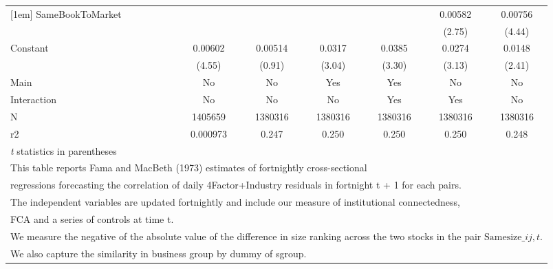 {\begin{tabular}{l*{6}{c}}
[1em]
SameBookToMarket    &                     &                     &                     &                     &     0.00582\sym{**} &     0.00756\sym{***}\\
                    &                     &                     &                     &                     &      (2.75)         &      (4.44)         \\
[1em]
Constant            &     0.00602\sym{***}&     0.00514         &      0.0317\sym{**} &      0.0385\sym{**} &      0.0274\sym{**} &      0.0148\sym{*}  \\
                    &      (4.55)         &      (0.91)         &      (3.04)         &      (3.30)         &      (3.13)         &      (2.41)         \\
\hline
Main                &          No         &          No         &         Yes         &         Yes         &          No         &          No         \\
Interaction         &          No         &          No         &          No         &         Yes         &         Yes         &          No         \\
N                   &     1405659         &     1380316         &     1380316         &     1380316         &     1380316         &     1380316         \\
r2                  &    0.000973         &       0.247         &       0.250         &       0.250         &       0.250         &       0.248         \\
\hline\hline
\multicolumn{7}{l}{\footnotesize \textit{t} statistics in parentheses}\\
\multicolumn{7}{l}{\footnotesize This table reports Fama and MacBeth (1973) estimates of fortnightly cross-sectional}\\
\multicolumn{7}{l}{\footnotesize  regressions forecasting the correlation of daily 4Factor+Industry residuals in fortnight t + 1 for each pairs.}\\
\multicolumn{7}{l}{\footnotesize The independent variables are updated fortnightly and include our measure of institutional connectedness,}\\
\multicolumn{7}{l}{\footnotesize  FCA and a series of controls at time t.}\\
\multicolumn{7}{l}{\footnotesize We measure the negative of the absolute value of the difference in size ranking across the two stocks in the pair $ \text{Samesize}\_{ij,t} $.}\\
\multicolumn{7}{l}{\footnotesize We also capture the similarity in business group by dummy of sgroup.}\\

\end{tabular}}
